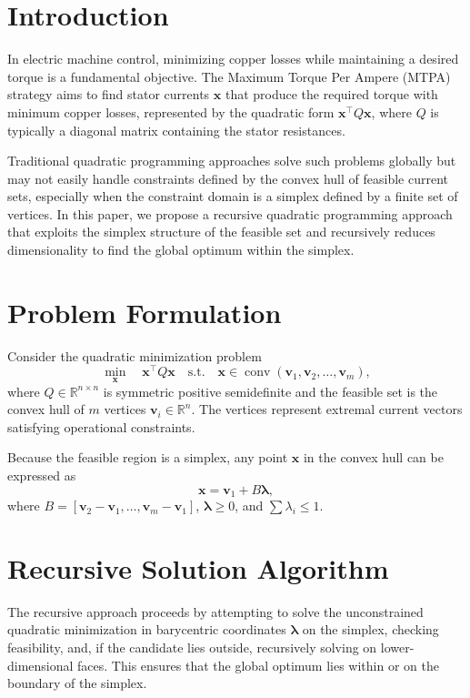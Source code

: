 \section{Introduction}

In electric machine control, minimizing copper losses while maintaining a
desired torque is a fundamental objective. The Maximum Torque Per Ampere
(MTPA) strategy aims to find stator currents \(\mathbf{x}\) that produce the
required torque with minimum copper losses, represented by the quadratic form
\(\mathbf{x}^\top Q\mathbf{x}\), where \(Q\) is typically a diagonal matrix
containing the stator resistances.

Traditional quadratic programming approaches solve such problems globally
but may not easily handle constraints defined by the convex hull of feasible
current sets, especially when the constraint domain is a simplex defined by a
finite set of vertices. In this paper, we propose a recursive quadratic
programming approach that exploits the simplex structure of the feasible set
and recursively reduces dimensionality to find the global optimum within the
simplex.

\section{Problem Formulation}

Consider the quadratic minimization problem
\begin{equation}
  \min_{\mathbf{x}} \quad \mathbf{x}^\top Q\mathbf{x}
  \quad \text{s.t.} \quad
  \mathbf{x}\in\operatorname{conv}(\mathbf{v}_1,\mathbf{v}_2,\ldots,\mathbf{v}_m),
\end{equation}
where \(Q\in\mathbb{R}^{n\times n}\) is symmetric positive semidefinite and
the feasible set is the convex hull of \(m\) vertices
\(\mathbf{v}_i\in\mathbb{R}^n\). The vertices represent extremal current
vectors satisfying operational constraints.

Because the feasible region is a simplex, any point \(\mathbf{x}\) in the
convex hull can be expressed as
\[
  \mathbf{x}=\mathbf{v}_1+B\boldsymbol{\lambda},
\]
where \(B=[\mathbf{v}_2-\mathbf{v}_1,\ldots,\mathbf{v}_m-\mathbf{v}_1]\),
\(\boldsymbol{\lambda}\geq0\), and \(\sum\lambda_i\leq1\).

\section{Recursive Solution Algorithm}

The recursive approach proceeds by attempting to solve the unconstrained
quadratic minimization in barycentric coordinates
\(\boldsymbol{\lambda}\) on the simplex, checking feasibility, and, if the
candidate lies outside, recursively solving on lower-dimensional faces. This
ensures that the global optimum lies within or on the boundary of the
simplex.

